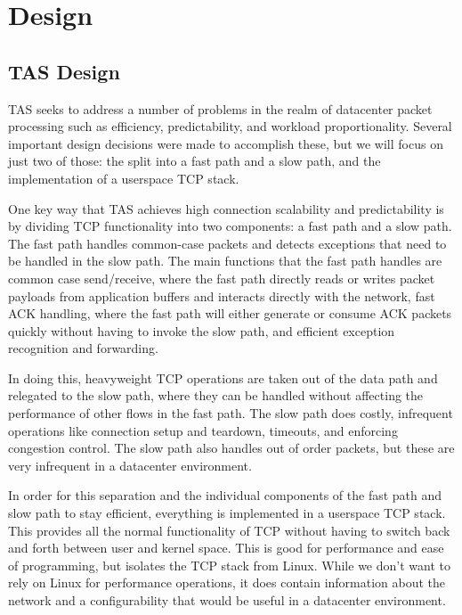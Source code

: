 \section{Design}\label{Design}

\subsection{TAS Design}

TAS seeks to address a number of problems in the realm of datacenter packet
processing such as efficiency, predictability, and workload proportionality. 
Several important design decisions were made to accomplish these, but we will 
focus on just two of those: the split into a fast path and a slow path, and the
implementation of a userspace TCP stack.

One key way that TAS achieves high connection scalability and 
predictability is by dividing TCP functionality into two components: a fast 
path and a slow path. The fast path handles common-case packets and detects 
exceptions that need to be handled in the slow path. The main functions that
the fast path handles are common case send/receive, where the fast path directly
reads or writes packet payloads from application buffers and interacts directly
with the network, fast ACK handling, where the fast path will either generate or
consume ACK packets quickly without having to invoke the slow path, and 
efficient exception recognition and forwarding. 

In doing this, heavyweight TCP operations are taken out of the data path and 
relegated to the slow path, where they can be handled without affecting the 
performance of other flows in the fast path. The slow path does costly, 
infrequent operations like connection setup and teardown, timeouts, and 
enforcing congestion control. The slow path also handles out of order packets, 
but these are very infrequent in a datacenter environment.
   
In order for this separation and the individual components of the fast path 
and slow path to stay efficient, everything is implemented in a userspace TCP
stack. This provides all the normal functionality of TCP without having to 
switch back and forth between user and kernel space. This is good for 
performance and ease of programming, but isolates the TCP stack from Linux.
While we don't want to rely on Linux for performance operations, it does contain
information about the network and a configurability that would be useful in a 
datacenter environment.


